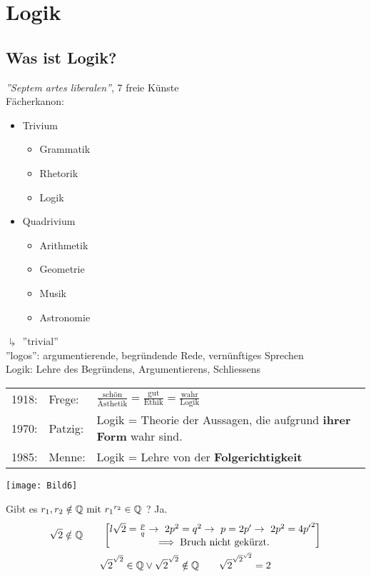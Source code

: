 \chapter{Logik}
\section{Was ist Logik?}
\textit{''Septem artes liberalen''}, 7 freie Künste \\
Fächerkanon:
\begin{itemize}
	\item Trivium
	\begin{itemize}
		\item Grammatik
		\item Rhetorik
		\item Logik
	\end{itemize}
	\item Quadrivium
	\begin{itemize}
		\item Arithmetik
		\item Geometrie
		\item Musik
		\item Astronomie
	\end{itemize}
\end{itemize}
$\drsh$ ''trivial'' \\
''logos'': argumentierende, begründende Rede, vernünftiges Sprechen \\
Logik: Lehre des Begründens, Argumentierens, Schliessens \\
\begin{tabular}{lll}
	1918:	& Frege:	& $\frac{\text{schön}}{\text{Ästhetik}} = \frac{\text{gut}}{\text{Ethik}} = \frac{\text{wahr}}{\text{Logik}}$ \\
	1970:	& Patzig:	& Logik = Theorie der Aussagen, die aufgrund \textbf{ihrer Form} wahr sind. \\
	1985:	& Menne:	& Logik = Lehre von der \textbf{Folgerichtigkeit}
\end{tabular}
\texttt{[image: Bild6]} \\
\begin{bsp*}
	Gibt es $r_1 , r_2 \notin \mathbb{Q} \text{ mit } {r_1}^{r_2} \in \mathbb{Q}$ ? Ja.
	\begin{gather*}
		\sqrt{2} \notin \Q \qquad
		\begin{bmatrix*}{l}
			\sqrt{2} = \frac{p}{q} \rightarrow 2p^2 = q^2 \rightarrow p = 2p' \rightarrow 2p^2 = 4{p'}^2 \\
			\implies \text{Bruch nicht gekürzt.}
		\end{bmatrix*} \\
		{\sqrt{2}}^{\sqrt{2}} \in \Q \vee {\sqrt{2}}^{\sqrt{2}} \notin \Q \qquad \sqrt{2}^{{\sqrt{2}}^{\sqrt{2}}} = 2
	\end{gather*}
\end{bsp*}
